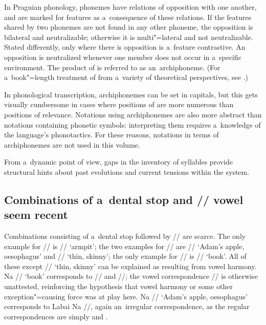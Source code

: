 			In Praguian phonology, phonemes have relations of opposition with one another, and are marked for features as
			a~consequence of these relations. If the features shared by two phonemes are not found in any other
			phoneme, the opposition is bilateral and neutralizable; otherwise it is multi"=lateral and not
			neutralizable. Stated differently, only where there is opposition is a~feature contrastive. An
			opposition is neutralized whenever one member does not occur in a~specific environment. The product
			of  is referred to as an~archiphoneme. (For a~book"=length treatment of  from a~variety of theoretical perspectives, see \citealt{silverman2012}.)
			
			In phonological transcription, archiphonemes can be set in capitals, but this gets visually
			cumbersome in cases where positions of  are more numerous than
			positions of relevance. Notations using archiphonemes are also more abstract than notations
			containing phonetic symbols: interpreting them requires a~knowledge of the language's
			phonotactics. For these reasons, notations in terms of archiphonemes are not used in this volume.
			
			From a~dynamic point of view, gaps in the inventory of syllables provide structural hints about past
			evolutions and current tensions within the system.
			

			\subsection{Combinations of a~dental stop and  // vowel seem recent}
			\label{sec:combinationsofadentalstopandvowelareprobablyrecent}
			
			Combinations consisting of a~dental stop followed by // are scarce. The only example for
			// is // ‘armpit’; the two examples for // are // ‘Adam’s
			apple, oesophagus’ and // ‘thin, skinny’; the only example for // is
			// ‘book’. All of these except // ‘thin, skinny’ can be explained as
			resulting from vowel harmony. Na // ‘book’ corresponds to  // and 
			//; the vowel correspondence // is otherwise unattested, reinforcing the
			hypothesis that vowel harmony or some other exception"=causing force was at play here. Na
			// ‘Adam’s apple, oesophagus’ corresponds to Labai Na //, again an~irregular
			correspondence, as the regular correspondences are simply  and . 
			
